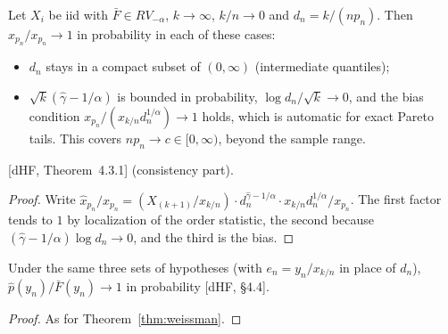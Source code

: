 \begin{theorem}
  \label{thm:weissman}
  \leanok
  Let $X_i$ be iid with $\bar F \in RV_{-\alpha}$, $k \to \infty$, $k/n \to 0$ and
  $d_n = k/(n p_n)$. Then $\hat x_{p_n}/x_{p_n} \to 1$ in probability in each of these cases:
  \begin{itemize}
    \item $d_n$ stays in a compact subset of $(0, \infty)$ (intermediate quantiles);
    \item $\sqrt{k}(\hat\gamma - 1/\alpha)$ is bounded in probability, $\log d_n / \sqrt k \to 0$, and the
      bias condition $x_{p_n} / (x_{k/n} d_n^{1/\alpha}) \to 1$ holds, which is automatic for exact
      Pareto tails. This covers $n p_n \to c \in [0, \infty)$, beyond the sample range.
  \end{itemize}
  [dHF, Theorem~4.3.1] (consistency part).
\end{theorem}
\begin{proof}
  \leanok
  Write $\hat x_{p_n}/x_{p_n} = (X_{(k+1)}/x_{k/n}) \cdot d_n^{\hat\gamma - 1/\alpha} \cdot
  x_{k/n} d_n^{1/\alpha} / x_{p_n}$. The first factor tends to $1$ by localization of the order
  statistic, the second because $(\hat\gamma - 1/\alpha) \log d_n \to 0$, and the third is the bias.
\end{proof}

\begin{theorem}
  \label{thm:tail-prob-estimator}
  \leanok
  Under the same three sets of hypotheses (with $e_n = y_n/x_{k/n}$ in place of $d_n$),
  $\hat p(y_n)/\bar F(y_n) \to 1$ in probability [dHF, \S4.4].
\end{theorem}
\begin{proof}
  \leanok
  As for Theorem~\ref{thm:weissman}.
\end{proof}

